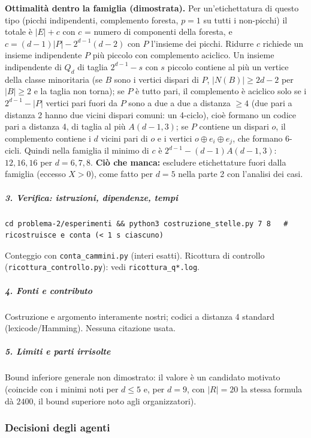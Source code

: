 \documentclass[11pt,a4paper]{article}
\begin{document}
\textbf{Ottimalità dentro la famiglia (dimostrata).} Per
un'etichettatura di questo tipo (picchi indipendenti, complemento
foresta, \(p=1\) su tutti i non-picchi) il totale è \(|E|+c\) con \(c\)
= numero di componenti della foresta, e \(c=(d-1)|P|-2^{d-1}(d-2)\) con
\(P\) l'insieme dei picchi. Ridurre \(c\) richiede un insieme
indipendente \(P\) più piccolo con complemento aciclico. Un insieme
indipendente di \(Q_d\) di taglia \(2^{d-1}-s\) con \(s\) piccolo
contiene al più un vertice della classe minoritaria (se \(B\) sono i
vertici dispari di \(P\), \(|N(B)|\ge 2d-2\) per \(|B|\ge2\) e la taglia
non torna); se \(P\) è tutto pari, il complemento è aciclico solo se i
\(2^{d-1}-|P|\) vertici pari fuori da \(P\) sono a due a due a distanza
\(\ge4\) (due pari a distanza 2 hanno due vicini dispari comuni: un
4-ciclo), cioè formano un codice pari a distanza 4, di taglia al più
\(A(d-1,3)\); se \(P\) contiene un dispari \(o\), il complemento
contiene i \(d\) vicini pari di \(o\) e i vertici
\(o\oplus e_i\oplus e_j\), che formano 6-cicli. Quindi nella famiglia il
minimo di \(c\) è \(2^{d-1}-(d-1)A(d-1,3)\): \(12,16,16\) per
\(d=6,7,8\). \textbf{Ciò che manca:} escludere etichettature fuori dalla
famiglia (eccesso \(X>0\)), come fatto per \(d=5\) nella parte 2 con
l'analisi dei casi.

\subparagraph{3. Verifica: istruzioni, dipendenze,
tempi}\label{verifica-istruzioni-dipendenze-tempi}

\begin{verbatim}
cd problema-2/esperimenti && python3 costruzione_stelle.py 7 8   # ricostruisce e conta (< 1 s ciascuno)
\end{verbatim}

Conteggio con \texttt{conta\_cammini.py} (interi esatti). Ricottura di
controllo (\texttt{ricottura\_controllo.py}): vedi
\texttt{ricottura\_q*.log}.

\subparagraph{4. Fonti e contributo}\label{fonti-e-contributo}

Costruzione e argomento interamente nostri; codici a distanza 4 standard
(lexicode/Hamming). Nessuna citazione usata.

\subparagraph{5. Limiti e parti
irrisolte}\label{limiti-e-parti-irrisolte}

Bound inferiore generale non dimostrato: il valore è un candidato
motivato (coincide con i minimi noti per \(d\le5\) e, per \(d=9\), con
\(|R|=20\) la stessa formula dà \(2400\), il bound superiore noto agli
organizzatori).

\subsubsection{Decisioni degli agenti}
\end{document}
